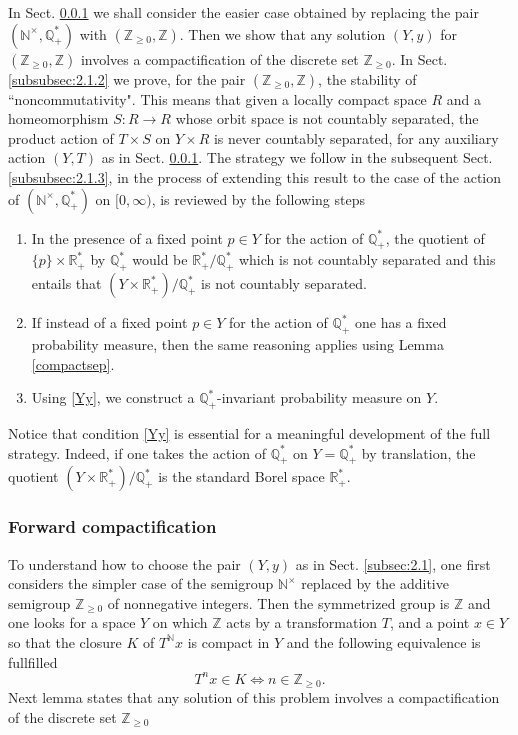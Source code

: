 \documentclass[graybox, envcountsect%
]{svmult}
\def\N{{\mathbb N}}
\def\Q{{\mathbb Q}}
\def\R{{\mathbb R}}
\def\Z{{\mathbb Z}}
\def\no{\noindent}
\def\nt{\N^{\times}}
\begin{document}
\no  In Sect. \ref{subsubsec:2.1.1} we shall consider  the easier case obtained by replacing the pair $(\nt, \Q^*_+)$ with  $(\Z_{\geq 0},\Z)$. Then we show that any solution $(Y,y)$ for  $(\Z_{\geq 0},\Z)$ involves a  compactification of the discrete set $\Z_{\geq 0}$.
 In Sect. \ref{subsubsec:2.1.2} we prove, for the pair $(\Z_{\geq 0},\Z)$, the stability of ``noncommutativity". This means that given a locally compact space $R$ and a homeomorphism $S:R\to R$ whose orbit space is not countably separated,   the product action of $T\times S$ on $Y\times R$ is never countably separated, for any  auxiliary action $(Y,T)$ as in Sect. \ref{subsubsec:2.1.1}.  The strategy we follow in the subsequent Sect. \ref{subsubsec:2.1.3}, in the process of extending this result to the case of the action of $(\nt, \Q^*_+)$ on $[0,\infty)$, is reviewed by the following steps\begin{enumerate} 
 \item In the presence of a fixed point $p\in Y$ for the action of 	$\Q^*_+$, the quotient of $\{p\}\times \R_+^*$ by 	$\Q^*_+$ would be $\R_+^*/\Q^*_+$ which is not countably separated and this entails that $(Y\times \R_+^*)/\Q^*_+$ is not countably separated.
 \item If instead of a fixed point $p\in Y$ for the action of 	$\Q^*_+$ one has a fixed probability measure, then the same reasoning applies using Lemma \ref{compactsep}.
\item Using \eqref{Yy}, we construct a $\Q^*_+$-invariant probability measure on $Y$.\end{enumerate}
 Notice that condition \eqref{Yy} is essential for a meaningful development of the full strategy. Indeed, if one takes the action of  	$\Q^*_+$ on 	$Y=\Q^*_+$ by translation, the quotient $(Y\times \R_+^*)/\Q^*_+$ is the standard Borel space $\R_+^*$. 



\subsubsection{Forward compactification}\label{subsubsec:2.1.1}

 To understand how to choose the pair $(Y,y)$ as in Sect. \ref{subsec:2.1}, one first considers the simpler case of the  semigroup $\nt$ replaced by the additive semigroup $\Z_{\geq 0}$ of nonnegative integers. Then the symmetrized group is $\Z$ and one looks  for a space $Y$ on which $\Z$ acts by a transformation $T$, and a point $x\in Y$ so that the closure $K$ of $T^\N x$ is  compact in $Y$ and the following equivalence is fullfilled
$$
T^nx \in K\iff n\in\Z_{\geq 0}.
$$
Next lemma states that any solution of this problem involves a compactification of the discrete set $\Z_{\geq 0}$
\end{document}
